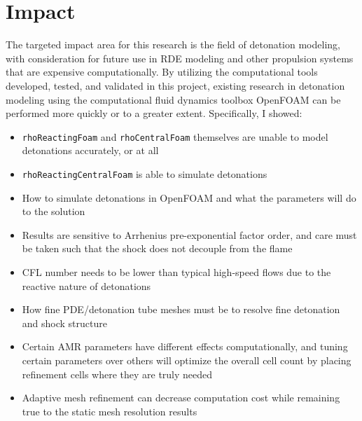 \section{Impact}
The targeted impact area for this research is the field of detonation modeling, with consideration for future use in RDE modeling and other propulsion systems that are expensive computationally. By utilizing the computational tools developed, tested, and validated in this project, existing research in detonation modeling using the computational fluid dynamics toolbox OpenFOAM can be performed more quickly or to a greater extent. Specifically, I showed:
\begin{itemize}
\item \verb|rhoReactingFoam| and \verb|rhoCentralFoam| themselves are unable to model detonations accurately, or at all 
\item \verb|rhoReactingCentralFoam| is able to simulate detonations
\item How to simulate detonations in OpenFOAM and what the parameters will do to the solution
\item Results are sensitive to Arrhenius pre-exponential factor order, and care must be taken such that the shock does not decouple from the flame
\item CFL number needs to be lower than typical high-speed flows due to the reactive nature of detonations
\item How fine PDE/detonation tube meshes must be to resolve fine detonation and shock structure
\item Certain AMR parameters have different effects computationally, and tuning certain parameters over others will optimize the overall cell count by placing refinement cells where they are truly needed 
\item Adaptive mesh refinement can decrease computation cost while remaining true to the static mesh resolution results 
\end{itemize}

